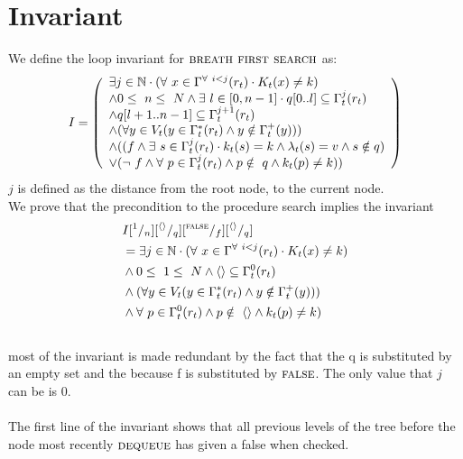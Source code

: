 \documentclass[headings=small,a4paper,12pt]{scrartcl}
\newcommand{\bfs}{\textsc{breath first search}\xspace}
\newcommand{\deq}{\textsc{dequeue}\xspace}
\begin{document}
\section{Invariant}
\label{sec:invariant}
\text We define the loop invariant for $\bfs$ as:\\
\begin{align*}
    &I = \left(
    \begin{array}{l}
         \exists j\in \mathbb{N}\cdot{}(\forall~x \in \Gamma^{\forall~i<j}(r_t)\cdot{}K_t(x) \ne k)\\
         \wedge 0\leq~n\leq~N\wedge \exists~l\in[0,n-1] \cdot{}q[0..l] \subseteq \Gamma^j_t(r_t)\\
         \wedge q[l+1..n-1] \subseteq \Gamma^{j+1}_t(r_t)\\
         \wedge (\forall y\in V_t(y\in \Gamma^{*}_{t}(r_t)\wedge y \notin\Gamma^{+}_{t}(y)))\\
         \wedge ((f\wedge\exists~s\in \Gamma^{j}_{t}(r_t)\cdot{}k_t(s) = k\wedge \lambda_t(s) = v\wedge s\notin q)\\
         \vee (\neg~f \wedge \forall~p \in \Gamma^j_t(r_t) \wedge p\notin~q \wedge k_t(p) \ne k))
    \end{array}
    \right)\\
\end{align*}
$j$ is defined as the distance from the root node, to the current node.\\
We prove that the precondition to the procedure search implies the invariant
\begin{align*}
    &I[^{1}/_{n}][^{\langle\rangle}/_{q}][^{\text{\textsc{false}}}/_{f}][^{\langle\rangle}/_{q}]\\
    &=  \exists j\in \mathbb{N}\cdot{}(\forall~x \in \Gamma^{\forall~i<j}(r_t)\cdot{}K_t(x) \ne k)\\
    &\wedge 0\leq~1\leq~N\wedge\langle\rangle \subseteq \Gamma^0_t(r_t)\\
    &\wedge (\forall y\in V_t(y\in \Gamma^{*}_{t}(r_t)\wedge y \notin\Gamma^{+}_{t}(y)))\\
    &\wedge\forall~p \in \Gamma^0_t(r_t) \wedge p\notin~\langle\rangle \wedge k_t(p) \ne k)
\end{align*}\\
most of the invariant is made redundant by the fact that the q is substituted by an empty set and the because f is substituted by $\text{\textsc{false}}$. The only value that $j$ can be is $0$.\\
\\
The first line of the invariant shows that all previous levels of the tree before the node most recently $\deq$ has given a false when checked.\\
\end{document}
